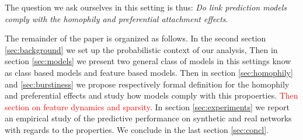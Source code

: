 The question we ask ourselves in this setting is thus: \textit{Do link prediction models comply with the homophily and preferential attachment effects}.


The remainder of the paper is organized as follows. In the second section \ref{sec:background} we set up the probabilistic context of our analysis, Then in section \ref{sec:models} we present two general class of models in this settings know as class based models and feature based models. Then in section \ref{sec:homophily} and \ref{sec:burstiness} we propose respectively formal definition for the homophily and preferential effects and study how models comply with this propoerties. \textcolor{red}{Then section on feature dynamics and sparsity}. In section \ref{sec:experiments} we report an empirical study of the predictive performance on synthetic and real networks with regards to the properties. We conclude in the last section \ref{sec:concl}. 
